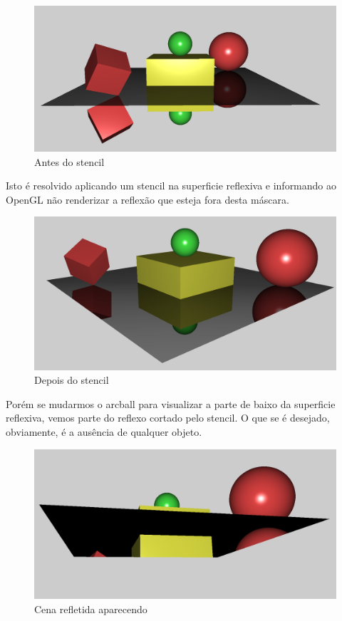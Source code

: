 \documentclass[11pt, a4paper]{article}
\begin{document}
\begin{figure}[H]
  \begin{center}
  \includegraphics[width=0.8\linewidth]{before-stencil.png}
  \caption{Antes do stencil}
  \label{fig:vaz}
  \end{center}
\end{figure}

Isto é resolvido aplicando um stencil na superficie reflexiva e informando ao 
OpenGL não renderizar a reflexão que esteja fora desta máscara.

\begin{figure}[H]
  \begin{center}
  \includegraphics[width=0.8\linewidth]{after-stencil.png}
  \caption{Depois do stencil}
  \label{fig:vaz}
  \end{center}
\end{figure}

Porém se mudarmos o arcball para visualizar a parte de baixo da superficie reflexiva, 
vemos parte do reflexo cortado pelo stencil. O que se é desejado, obviamente, é 
a ausência de qualquer objeto.

\begin{figure}[H]
  \begin{center}
  \includegraphics[width=0.8\linewidth]{before-cut-plan.png}
  \caption{Cena refletida aparecendo}
  \label{fig:vaz}
  \end{center}
\end{figure}
\end{document}
